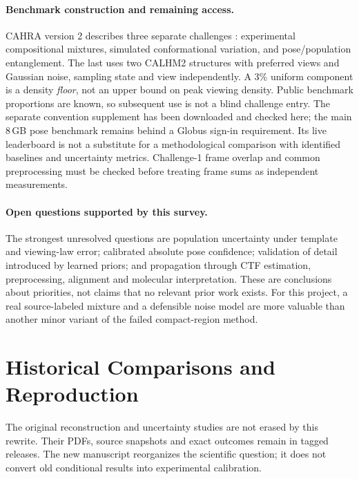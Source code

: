 \paragraph{Benchmark construction and remaining access.}
CAHRA version 2 describes three separate challenges
\citep{cahra2026}: experimental compositional mixtures, simulated
conformational variation, and pose/population entanglement. The last uses
two CALHM2 structures with preferred views and Gaussian noise, sampling
state and view independently. A 3\% uniform component is a density
\emph{floor}, not an upper bound on peak viewing density. Public benchmark
proportions are known, so subsequent use is not a blind challenge entry.
The separate convention supplement has been downloaded and checked here;
the main 8\,GB pose benchmark remains behind a Globus sign-in requirement.
Its live leaderboard is not a substitute for a methodological comparison
with identified baselines and uncertainty metrics. Challenge-1 frame overlap
and common preprocessing must be checked before treating frame sums as
independent measurements.

\paragraph{Open questions supported by this survey.}
The strongest unresolved questions are population uncertainty under template
and viewing-law error; calibrated absolute pose confidence; validation of
detail introduced by learned priors; and propagation through CTF estimation,
preprocessing, alignment and molecular interpretation. These are conclusions
about priorities, not claims that no relevant prior work exists. For this
project, a real source-labeled mixture and a defensible noise model are more
valuable than another minor variant of the failed compact-region method.

\section{Historical Comparisons and Reproduction}
\label{app:repro-new}
The original reconstruction and uncertainty studies are not erased by this
rewrite. Their PDFs, source snapshots and exact outcomes remain in tagged
releases. The new manuscript reorganizes the scientific question; it does
not convert old conditional results into experimental calibration.

